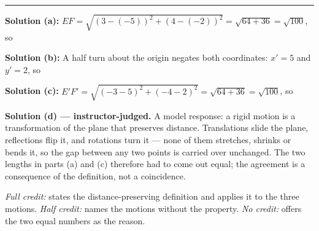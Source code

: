 \documentclass[12pt]{article}
\begin{document}
\vspace{0.2cm}\noindent\rule{\linewidth}{0.2pt}


\textbf{Solution (a):} $EF = \sqrt{(3-(-5))^2 + (4-(-2))^2} = \sqrt{64 + 36} = \sqrt{100}$, so 

\textbf{Solution (b):} A half turn about the origin negates both coordinates: $x' = 5$ and $y' = 2$, so 

\textbf{Solution (c):} $E'F' = \sqrt{(-3-5)^2 + (-4-2)^2} = \sqrt{64 + 36} = \sqrt{100}$, so 

\textbf{Solution (d) --- instructor-judged.} A model response: a rigid motion is a transformation of the plane that preserves distance. Translations slide the plane, reflections flip it, and rotations turn it --- none of them stretches, shrinks or bends it, so the gap between any two points is carried over unchanged. The two lengths in parts (a) and (c) therefore had to come out equal; the agreement is a consequence of the definition, not a coincidence.

\emph{Full credit:} states the distance-preserving definition and applies it to the three motions. \emph{Half credit:} names the motions without the property. \emph{No credit:} offers the two equal numbers as the reason.
\end{document}
